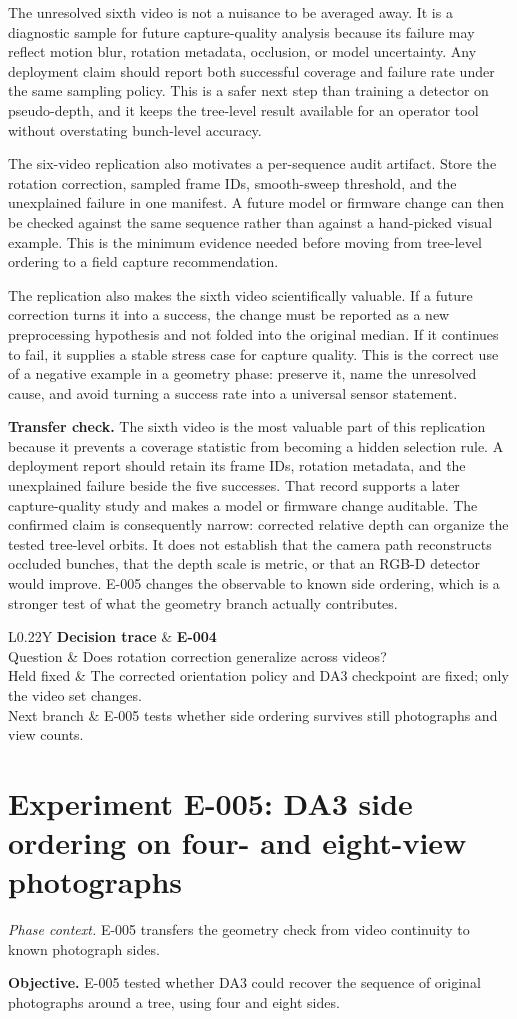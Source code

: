 \documentclass[preprint,12pt]{elsarticle}
\newcommand{\experiment}[2]{\par\medskip\Needspace{7\baselineskip}\section{Experiment #1: #2}}
\newcommand{\decisioncard}[4]{%
\begin{table}[H]\centering\small
\begin{tabularx}{\columnwidth}{L{0.22\columnwidth}Y}
\toprule
\textbf{Decision trace} & \textbf{#1}\\
Question & #2\\
Held fixed & #3\\
Next branch & #4\\
\bottomrule
\end{tabularx}
\end{table}}
\newcommand{\phasecontext}[1]{%
\par\smallskip\noindent\textit{Phase context.} #1\par\smallskip}
\begin{document}
The unresolved sixth video is not a nuisance to be averaged away. It is a
diagnostic sample for future capture-quality analysis because its failure may
reflect motion blur, rotation metadata, occlusion, or model uncertainty. Any
deployment claim should report both successful coverage and failure rate under
the same sampling policy. This is a safer next step than training a detector
on pseudo-depth, and it keeps the tree-level result available for an operator
tool without overstating bunch-level accuracy.

The six-video replication also motivates a per-sequence audit artifact. Store
the rotation correction, sampled frame IDs, smooth-sweep threshold, and the
unexplained failure in one manifest. A future model or firmware change can
then be checked against the same sequence rather than against a hand-picked
visual example. This is the minimum evidence needed before moving from
tree-level ordering to a field capture recommendation.

The replication also makes the sixth video scientifically valuable. If a
future correction turns it into a success, the change must be reported as a
new preprocessing hypothesis and not folded into the original median. If it
continues to fail, it supplies a stable stress case for capture quality. This
is the correct use of a negative example in a geometry phase: preserve it,
name the unresolved cause, and avoid turning a success rate into a universal
sensor statement.

\textbf{Transfer check.} The sixth video is the most valuable part of this
replication because it prevents a coverage statistic from becoming a hidden
selection rule. A deployment report should retain its frame IDs, rotation
metadata, and the unexplained failure beside the five successes. That record
supports a later capture-quality study and makes a model or firmware change
auditable. The confirmed claim is consequently narrow: corrected relative
depth can organize the tested tree-level orbits. It does not establish that
the camera path reconstructs occluded bunches, that the depth scale is
metric, or that an RGB-D detector would improve. E-005 changes the observable
to known side ordering, which is a stronger test of what the geometry branch
actually contributes.

\decisioncard{E-004}{Does rotation correction generalize across videos?}{The corrected orientation policy and DA3 checkpoint are fixed; only the video set changes.}{E-005 tests whether side ordering survives still photographs and view counts.}
\experiment{E-005}{DA3 side ordering on four- and eight-view photographs}
\phasecontext{E-005 transfers the geometry check from video continuity to known photograph sides.}
\textbf{Objective.} E-005 tested whether DA3 could recover the sequence of
original photographs around a tree, using four and eight sides.
\end{document}
